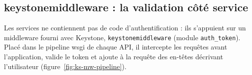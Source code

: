 \subsection{keystonemiddleware : la validation côté service}\label{sec:ks-middleware}

Les services ne contiennent pas de code d'authentification : ils s'appuient sur un \gls{middleware} fourni avec Keystone,
\texttt{keystonemiddleware} (module \texttt{auth\_token}). Placé dans le pipeline \gls{wsgi} de chaque API, il intercepte les requêtes
avant l'application, valide le token et ajoute à la requête des en-têtes décrivant l'utilisateur \parencite{keystonemiddleware}
(figure~\ref{fig:ks-mw-pipeline}).

